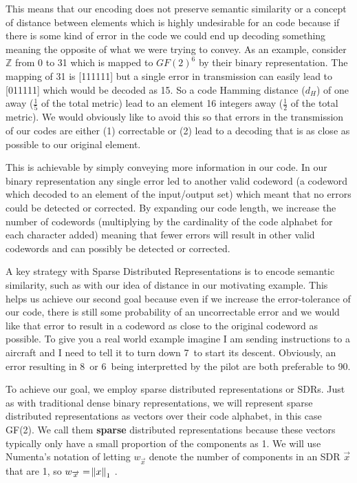 \documentclass[oneside,12pt,openany]{book}
\begin{document}
	This means that our encoding does not preserve semantic similarity or a concept of distance between elements which is highly undesirable for an code because if there is some kind of error in the code we could end up decoding something meaning the opposite of what we were trying to convey. As an example, consider $\mathbb{Z}$ from 0 to 31 which is mapped to $GF(2)^{6}$ by their binary representation. The mapping of 31 is [111111] but a single error in transmission can easily lead to [011111] which would be decoded as 15. So a code Hamming distance ($d_{H}$) of one away ($\frac{1}{5}$ of the total metric) lead to an element 16 integers away ($\frac{1}{2}$ of the total metric). We would obviously like to avoid this so that errors in the transmission of our codes are either (1) correctable or (2) lead to a decoding that is as close as possible to our original element.
	
	This is achievable by simply conveying more information in our code. In our binary representation any single error led to another valid codeword (a codeword which decoded to an element of the input/output set) which meant that no errors could be detected or corrected. By expanding our code length, we increase the number of codewords (multiplying by the cardinality of the code alphabet for each character added) meaning that fewer errors will result in other valid codewords and can possibly be detected or corrected. 
	
	A key strategy with Sparse Distributed Representations is to encode semantic similarity, such as with our idea of distance in our motivating example. This helps us achieve our second goal because even if we increase the error-tolerance of our code, there is still some probability of an uncorrectable error and we would like that error to result in a codeword as close to the original codeword as possible. To give you a real world example imagine I am sending instructions to a aircraft and I need to tell it to turn down 7\textdegree~to start its descent. Obviously, an error resulting in 8\textdegree~or 6\textdegree~being interpretted by the pilot are both preferable to 90\textdegree.
	
	To achieve our goal, we employ sparse distributed representations or SDRs. Just as with traditional dense binary representations, we will represent sparse distributed representations as vectors over their code alphabet, in this case GF(2). We call them \textbf{sparse} distributed representations because these vectors typically only have a small proportion of the components as 1. We will use Numenta's notation of letting $w_{\overrightarrow{x}}$ denote the number of components in an SDR $\overrightarrow{x}$ that are 1, so $w_{\overrightarrow{x}} = \norm{x}_{1}$ \cite{Properties}.
	
\end{document}

